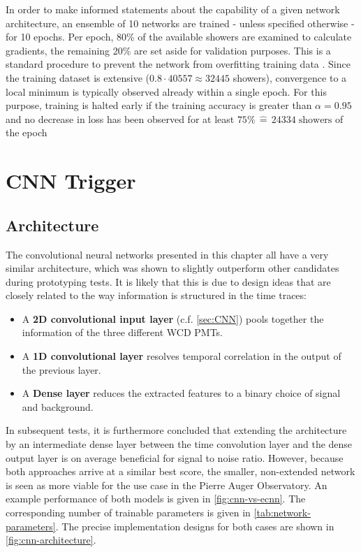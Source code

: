 In order to make informed statements about the capability of a given network architecture, an ensemble of 10 networks are trained - unless specified otherwise - for 
10 epochs. Per epoch, 80\% of the available showers are examined to calculate gradients, the remaining 20\% are set aside for validation purposes. This is a standard 
procedure to prevent the network from overfitting training data \cite{nasteski2017overview}. Since the training dataset is extensive ($0.8\cdot40557\approx32445$ 
showers), convergence to a local minimum is typically observed already within a single epoch. For this purpose, training is halted early if the training accuracy
is greater than $\alpha = 0.95$ and no decrease in loss has been observed for at least $75\%\,\hat{=}\,24334\;\text{showers}$ of the epoch

\section{CNN Trigger}
\label{sec:cnn-performance}

\subsection{Architecture}
\label{ssec:cnn-architecture}

The convolutional neural networks presented in this chapter all have a very similar architecture, which was shown to slightly outperform other candidates during 
prototyping tests. It is likely that this is due to design ideas that are closely related to the way information is structured in the time traces:

\begin{itemize}
	\item A \textbf{2D convolutional input layer} (c.f. \autoref{sec:CNN}) pools together the information of the three different WCD PMTs.
	\item A \textbf{1D convolutional layer} resolves temporal correlation in the output of the previous layer.
	\item A \textbf{Dense layer} reduces the extracted features to a binary choice of signal and background.
\end{itemize}

In subsequent tests, it is furthermore concluded that extending the architecture by an intermediate dense layer between the time convolution layer and the dense 
output layer is on average beneficial for signal to noise ratio. However, because both approaches arrive at a similar best score, the smaller, non-extended network
is seen as more viable for the use case in the Pierre Auger Observatory. An example performance of both models is given in \autoref{fig:cnn-vs-ecnn}. The 
corresponding number of trainable parameters is given in \autoref{tab:network-parameters}. The precise implementation designs for both cases are shown in 
\autoref{fig:cnn-architecture}.

